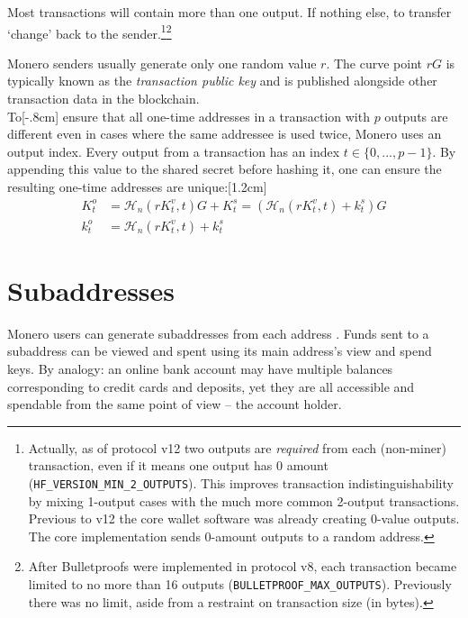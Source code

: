 Most transactions will contain more than one output. If nothing else, to transfer `change’ back to the sender.\footnote{Actually, as of protocol v12 two outputs are {\em required} from each (non-miner) transaction, even if it means one output has 0 amount ({\tt HF\_VERSION\_MIN\_2\_OUTPUTS}). This improves transaction indistinguishability by mixing 1-output cases with the much more common 2-output transactions. Previous to v12 the core wallet software was already creating 0-value outputs. The core implementation sends 0-amount outputs to a random address.}\footnote{After Bulletproofs were implemented in protocol v8, each transaction became limited to no more than 16 outputs ({\tt BULLETPROOF\_MAX\_OUTPUTS}). Previously there was no limit, aside from a restraint on transaction size (in bytes).}%

Monero senders usually generate only one random value $r$. The curve point $r G$ is typically known as the {\em transaction public key} and is published alongside other transaction data in the blockchain.\\

To[-.8cm] ensure that all one-time addresses in a transaction with $p$ outputs are different even in cases where the same addressee is used twice, Monero uses an output index. Every output from a transaction has an index $t \in \{0, ..., p-1\}$. By appending this value to the shared secret before hashing it, one can ensure the resulting one-time addresses are unique:[1.2cm]\vspace{.175cm}%
\begin{align*}
  K_t^o &= \mathcal{H}_n(r K_t^v, t)G + K_t^s = (\mathcal{H}_n(r K_t^v, t) + k_t^s)G  \\ 
  k_t^o &= \mathcal{H}_n(r K_t^v, t) + k_t^s
\end{align*} 



\section{Subaddresses}
\label{sec:subaddresses}

Monero users can generate subaddresses from each address \cite{MRL-0006-subaddresses}. Funds sent to a subaddress can be viewed and spent using its main address’s view and spend keys. By analogy: an online bank account may have multiple balances corresponding to credit cards and deposits, yet they are all accessible and spendable from the same point of view – the account holder.\\

